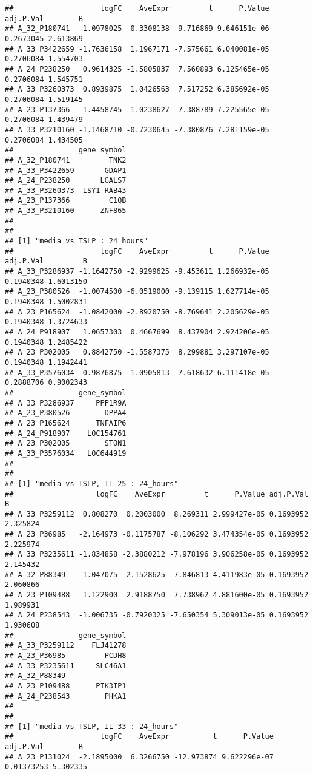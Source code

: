 \documentclass[
]{article}
\begin{document}
\begin{verbatim}
##                    logFC    AveExpr         t      P.Value adj.P.Val        B
## A_32_P180741   1.0978025 -0.3308138  9.716869 9.646151e-06 0.2673045 2.613869
## A_33_P3422659 -1.7636158  1.1967171 -7.575661 6.040081e-05 0.2706084 1.554703
## A_24_P238250   0.9614325 -1.5805837  7.560893 6.125465e-05 0.2706084 1.545751
## A_33_P3260373  0.8939875  1.0426563  7.517252 6.385692e-05 0.2706084 1.519145
## A_23_P137366  -1.4458745  1.0238627 -7.388789 7.225565e-05 0.2706084 1.439479
## A_33_P3210160 -1.1468710 -0.7230645 -7.380876 7.281159e-05 0.2706084 1.434505
##               gene_symbol
## A_32_P180741         TNK2
## A_33_P3422659       GDAP1
## A_24_P238250       LGALS7
## A_33_P3260373  ISY1-RAB43
## A_23_P137366         C1QB
## A_33_P3210160      ZNF865
## 
## 
## [1] "media vs TSLP : 24_hours"
##                    logFC    AveExpr         t      P.Value adj.P.Val         B
## A_33_P3286937 -1.1642750 -2.9299625 -9.453611 1.266932e-05 0.1940348 1.6013150
## A_23_P380526  -1.0074500 -6.0519000 -9.139115 1.627714e-05 0.1940348 1.5002831
## A_23_P165624  -1.0842000 -2.8920750 -8.769641 2.205629e-05 0.1940348 1.3724633
## A_24_P918907   1.0657303  0.4667699  8.437904 2.924206e-05 0.1940348 1.2485422
## A_23_P302005   0.8842750 -1.5587375  8.299881 3.297107e-05 0.1940348 1.1942441
## A_33_P3576034 -0.9876875 -1.0905813 -7.618632 6.111418e-05 0.2888706 0.9002343
##               gene_symbol
## A_33_P3286937     PPP1R9A
## A_23_P380526        DPPA4
## A_23_P165624      TNFAIP6
## A_24_P918907    LOC154761
## A_23_P302005        STON1
## A_33_P3576034   LOC644919
## 
## 
## [1] "media vs TSLP, IL-25 : 24_hours"
##                   logFC    AveExpr         t      P.Value adj.P.Val        B
## A_33_P3259112  0.808270  0.2003000  8.269311 2.999427e-05 0.1693952 2.325824
## A_23_P36985   -2.164973 -0.1175787 -8.106292 3.474354e-05 0.1693952 2.225974
## A_33_P3235611 -1.834858 -2.3880212 -7.978196 3.906258e-05 0.1693952 2.145432
## A_32_P88349    1.047075  2.1528625  7.846813 4.411983e-05 0.1693952 2.060866
## A_23_P109488   1.122900  2.9188750  7.738962 4.881600e-05 0.1693952 1.989931
## A_24_P238543  -1.006735 -0.7920325 -7.650354 5.309013e-05 0.1693952 1.930608
##               gene_symbol
## A_33_P3259112    FLJ41278
## A_23_P36985         PCDH8
## A_33_P3235611     SLC46A1
## A_32_P88349              
## A_23_P109488      PIK3IP1
## A_24_P238543        PHKA1
## 
## 
## [1] "media vs TSLP, IL-33 : 24_hours"
##                    logFC    AveExpr          t      P.Value  adj.P.Val        B
## A_23_P131024  -2.1895000  6.3266750 -12.973874 9.622296e-07 0.01373253 5.302335

\end{verbatim}
\end{document}
